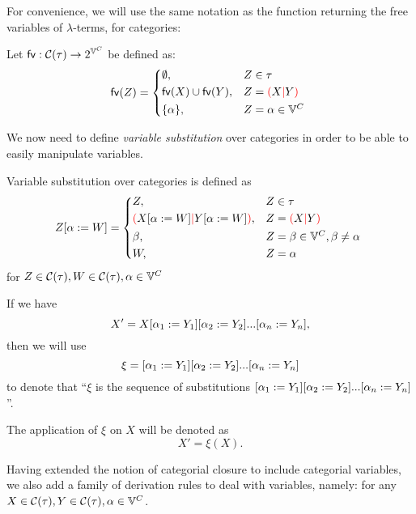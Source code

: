 \documentclass[main.tex]{subfiles}
\begin{document}
For convenience, we will use the same notation as the function returning the free variables of $\lambda$-terms, for categories:
\begin{defn}
    Let $\mathsf{fv} : \mathcal{C}( \tau ) \rightarrow 2^{\mathbb{V}^{C}}$ be defined as:
    \[
        \fv{Z} =
        \begin{cases*}
            \emptyset ,& $Z \in \tau$ \\
            \fv{X} \cup \fv{Y} ,& $Z = \lp X \mc Y \rp$ \\
            \{ \alpha \} ,& $Z = \alpha \in \cvars$ \\
        \end{cases*}
    \]
\end{defn}

We now need to define \emph{variable substitution} over categories in order
to be able to easily manipulate variables.
\begin{defn}
    Variable substitution over categories is defined as
    \[
        \subst{Z}{\alpha}{W} =
        \begin{cases*}
            Z ,& $Z \in \tau$ \\
            \lp \subst{X}{\alpha}{W} \mc \subst{Y}{\alpha}{W} \rp ,& $Z = \lp X \mc Y \rp$ \\
            \beta ,& $Z = \beta \in \cvars, \beta \neq \alpha$ \\
            W ,& $Z = \alpha$ \\
        \end{cases*}
    \]
    for $Z \in \mathcal{C}( \tau ), W \in \mathcal{C}( \tau ), \alpha \in \mathbb{V}^{C}$
\end{defn}

\begin{convention}
    If we have
    \[ X' = X [ \alpha_1 := Y_1 ] [ \alpha_2 := Y_2 ]... [ \alpha_n := Y_n ], \]
    then we will use
    \[ \xi =  [ \alpha_1 := Y_1 ] [ \alpha_2 := Y_2 ]... [ \alpha_n := Y_n ] \]
    to denote that ``$\xi$ is the sequence of substitutions
    $ [ \alpha_1 := Y_1 ] [ \alpha_2 := Y_2 ]... [ \alpha_n := Y_n ]$''.

    The application of $\xi$ on $X$ will be denoted as
    \[ X' = \xi(X). \]
\end{convention}

Having extended the notion of categorial closure to include categorial variables,
we also add a family of derivation rules to deal with variables, namely:
for any $X \in \mathcal{C}( \tau ), Y \in \mathcal{C}( \tau ), \alpha \in \mathbb{V}^{C}$.
\end{document}
